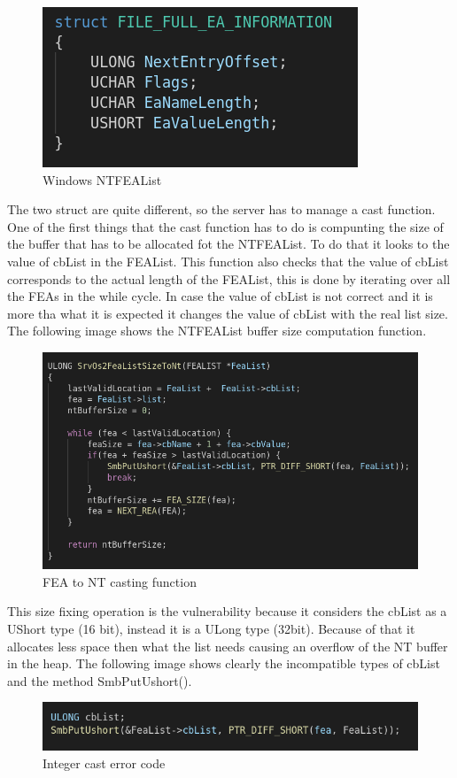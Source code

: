 \begin{figure}[ht!]
  \centering
    \includegraphics[scale=0.5]{images/windows_ea_struct.png}
    \caption{Windows NTFEAList}
\end{figure}
\noindent The two struct are quite different, so the server has to manage a cast function.\\
One of the first things that the cast function has to do is compunting the size of the buffer that has to be allocated fot the NTFEAList. To do that 
it looks to the value of cbList in the FEAList.
This function also checks that the value of cbList corresponds to the actual length of the FEAList, this is done by iterating over all the FEAs in the while cycle.
In case the value of cbList is not correct and it is more tha what it is expected it changes the value of cbList with the real list size.\\
The following image shows the NTFEAList buffer size computation function.

\begin{figure}[ht!]
  \centering
    \includegraphics[scale=0.5]{images/SrvOs2FeaListSizeToNt.png}
    \caption{FEA to NT casting function}
\end{figure}

\noindent This size fixing operation is the vulnerability because it considers the cbList as a UShort type (16 bit), instead it is a ULong type (32bit).
Because of that it allocates less space then what the list needs causing an overflow of the NT buffer in the heap\cite{exploit-db}.
The following image shows clearly the incompatible types of cbList and the method SmbPutUshort().
\begin{figure}[ht!]
  \centering
    \includegraphics[scale=0.5]{images/vulnerable_lines.png}
    \caption{Integer cast error code}
\end{figure}

